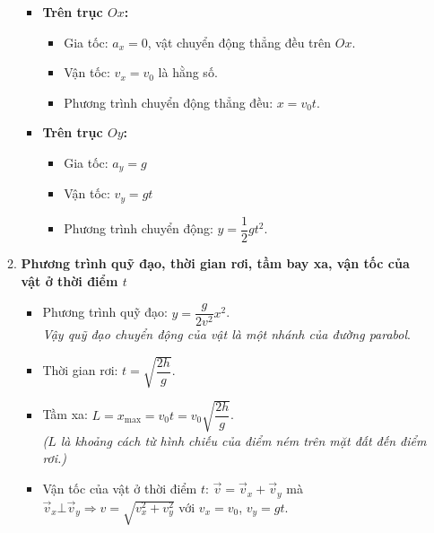 \begin{enumerate}[label=\bfseries\Roman*.]
\begin{enumerate}[label=\bfseries \alph*.]
\begin{center}
		\end{center}
		\begin{itemize}
			\item \textbf{Trên trục $Ox$:}
			\begin{itemize}
				\item Gia tốc: $a_x=0$, vật chuyển động thẳng đều trên $Ox$.
				\item Vận tốc: $v_x=v_0$ là hằng số.
				\item Phương trình chuyển động thẳng đều: $x=v_0t$.
			\end{itemize}
			\item \textbf{Trên trục $Oy$:}
			\begin{itemize}
				\item Gia tốc: $a_y=g$
				\item Vận tốc: $v_y=gt$
				\item Phương trình chuyển động: $y=\dfrac{1}{2}gt^2$.
			\end{itemize}
		\end{itemize}
		\item \textbf{Phương trình quỹ đạo, thời gian rơi, tầm bay xa, vận tốc của vật ở thời điểm $t$}
		\begin{itemize}
			\item Phương trình quỹ đạo: $y=\dfrac{g}{2v^2}x^2$.\\
			\textit{Vậy quỹ đạo chuyển động của vật là một nhánh của đường parabol}.
			\item Thời gian rơi: $t=\sqrt{\dfrac{2h}{g}}$.
			\item Tầm xa: $L=x_{\max}=v_0t=v_0\sqrt{\dfrac{2h}{g}}$.\\
			\textit{($L$ là khoảng cách từ hình chiếu của điểm ném trên mặt đất đến điểm rơi.)}
			\item Vận tốc của vật ở thời điểm $t$: $\vec{v}=\vec{v}_x+\vec{v}_y$ mà $\vec{v}_x\bot\vec{v}_{y}\Rightarrow v=\sqrt{v^2_x+v^2_y}$ với $v_x=v_0$, $v_y=gt$.
		\end{itemize}
	\end{enumerate}
\end{enumerate}
